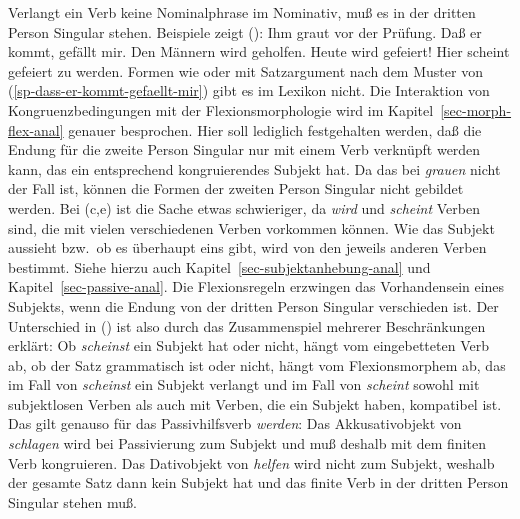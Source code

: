 Verlangt ein Verb keine Nominalphrase im Nominativ, muß es in der dritten Person Singular stehen.
Beispiele zeigt ():
\eal
\ex Ihm graut vor der Prüfung.
\ex\label{sp-dass-er-kommt-gefaellt-mir}
Daß er kommt, gefällt mir.
\ex Den Männern wird geholfen.
\ex Heute wird gefeiert!
\ex Hier scheint gefeiert zu werden.\label{bsp-scheint-gefeiert-zu-werden}
\zl
Formen wie  oder  mit Satzargument nach dem Muster von
(\ref{sp-dass-er-kommt-gefaellt-mir}) gibt es im Lexikon nicht. 
Die Interaktion von Kongruenzbedingungen mit der Flexionsmorphologie wird 
im Kapitel~\ref{sec-morph-flex-anal} genauer besprochen. Hier soll lediglich festgehalten werden,
daß \zb die Endung für die zweite Person Singular nur mit einem Verb verknüpft
werden kann, das ein entsprechend kongruierendes Subjekt hat. Da das bei \emph{grauen} nicht der Fall
ist, können die Formen der zweiten Person Singular nicht gebildet werden.
Bei (c,e) ist die Sache etwas schwieriger, da \emph{wird} und \emph{scheint} Verben sind,
die mit vielen verschiedenen Verben vorkommen können. Wie das Subjekt aussieht bzw.\ ob es überhaupt
eins gibt, wird von den jeweils anderen Verben bestimmt.
Siehe hierzu auch Kapitel~\ref{sec-subjektanhebung-anal} und Kapitel~\ref{sec-passive-anal}.
Die Flexionsregeln erzwingen
das Vorhandensein eines Subjekts, wenn die Endung von der dritten Person Singular verschieden
ist. Der Unterschied in () ist also durch das Zusammenspiel mehrerer Beschränkungen
erklärt: Ob \emph{scheinst} ein Subjekt hat oder nicht, hängt vom eingebetteten Verb ab,
ob der Satz grammatisch ist oder nicht, hängt vom Flexionsmorphem ab, das im Fall
von \emph{scheinst} ein Subjekt verlangt und im Fall von \emph{scheint} sowohl mit
subjektlosen Verben als auch mit Verben, die ein Subjekt haben, kompatibel ist.
\eal
{}
\zl
Das gilt genauso für das Passivhilfsverb \emph{werden}:
\eal\label{bsp-kongruenz-passiv}
\zl
Das Akkusativobjekt von \emph{schlagen} wird bei Passivierung zum
Subjekt und muß deshalb mit dem finiten Verb kongruieren. Das Dativobjekt
von \emph{helfen} wird nicht zum Subjekt, weshalb der gesamte Satz
dann kein Subjekt hat und das finite Verb in der dritten Person Singular
stehen muß.

